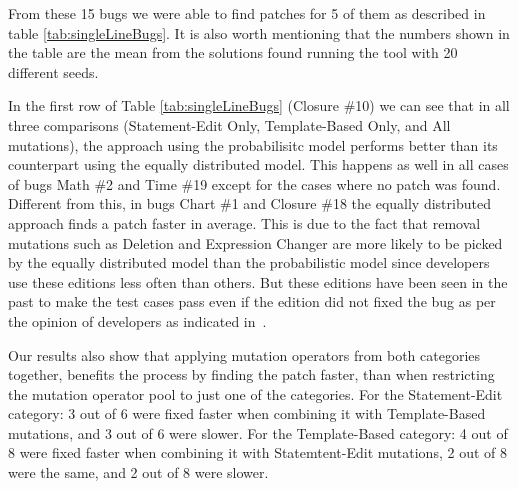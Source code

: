 \documentclass[conference]{IEEEtran}
\begin{document}
From these 15 bugs we were able to find patches for 5 of them as described in table \ref{tab:singleLineBugs}. It is also worth mentioning that the numbers shown in the table are the mean from the solutions found running the tool with 20 different seeds. 

In the first row of Table \ref{tab:singleLineBugs} (Closure \#10) we can see that in all three comparisons (Statement-Edit Only, Template-Based Only, and All mutations), the approach using the probabilisitc model performs better than its counterpart using the equally distributed model. This happens as well in all cases of bugs Math \#2 and Time \#19 except for the cases where no patch was found. Different from this, in bugs Chart \#1 and Closure \#18 the equally distributed approach finds a patch faster in average. This is due to the fact that removal mutations such as Deletion and Expression Changer are more likely to be picked by the equally distributed model than the probabilistic model since developers use these editions less often than others. But these editions have been seen in the past to make the test cases pass even if the edition did not fixed the bug as per the opinion of developers as indicated in~\cite{kim2013}.

Our results also show that applying mutation operators from both categories together, benefits the process by finding the patch faster, than when restricting the mutation operator pool to just one of the categories. For the Statement-Edit category: 3 out of 6 were fixed faster when combining it with Template-Based mutations, and 3 out of 6 were slower. For the Template-Based category: 4 out of 8 were fixed faster when combining it with Statemtent-Edit mutations, 2 out of 8 were the same, and 2 out of 8 were slower.
\end{document}
